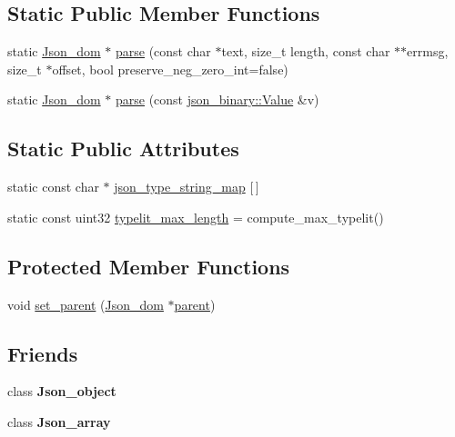 \subsection*{Static Public Member Functions}
\begin{DoxyCompactItemize}
\item 
static \mbox{\hyperlink{classJson__dom}{Json\+\_\+dom}} $\ast$ \mbox{\hyperlink{classJson__dom_a9615aa0ae1427d5f5986a2d85d506716}{parse}} (const char $\ast$text, size\+\_\+t length, const char $\ast$$\ast$errmsg, size\+\_\+t $\ast$offset, bool preserve\+\_\+neg\+\_\+zero\+\_\+int=false)
\item 
static \mbox{\hyperlink{classJson__dom}{Json\+\_\+dom}} $\ast$ \mbox{\hyperlink{classJson__dom_af266094649ea67b74f8af7630d975624}{parse}} (const \mbox{\hyperlink{classjson__binary_1_1Value}{json\+\_\+binary\+::\+Value}} \&v)
\end{DoxyCompactItemize}
\subsection*{Static Public Attributes}
\begin{DoxyCompactItemize}
\item 
static const char $\ast$ \mbox{\hyperlink{classJson__dom_a8950ef7adf835a0dc222a7083f63b355}{json\+\_\+type\+\_\+string\+\_\+map}} \mbox{[}$\,$\mbox{]}
\item 
static const uint32 \mbox{\hyperlink{classJson__dom_ac2b332f0624e8106149ecdb15aeabc2f}{typelit\+\_\+max\+\_\+length}} = compute\+\_\+max\+\_\+typelit()
\end{DoxyCompactItemize}
\subsection*{Protected Member Functions}
\begin{DoxyCompactItemize}
\item 
void \mbox{\hyperlink{classJson__dom_aa3e442670c5334539f3ba6842ea0b37c}{set\+\_\+parent}} (\mbox{\hyperlink{classJson__dom}{Json\+\_\+dom}} $\ast$\mbox{\hyperlink{classJson__dom_a0cd11e9bcf413aaf092fbf87a85d8dc4}{parent}})
\end{DoxyCompactItemize}
\subsection*{Friends}
\begin{DoxyCompactItemize}
\item 
\mbox{\label{classJson__dom_a0feb651c567e45a0ede655b270d8994d}} 
class {\bfseries Json\+\_\+object}
\item 
\mbox{\label{classJson__dom_a9b459c477ccb4cd61d44fed9f0d682fd}} 
class {\bfseries Json\+\_\+array}
\end{DoxyCompactItemize}


